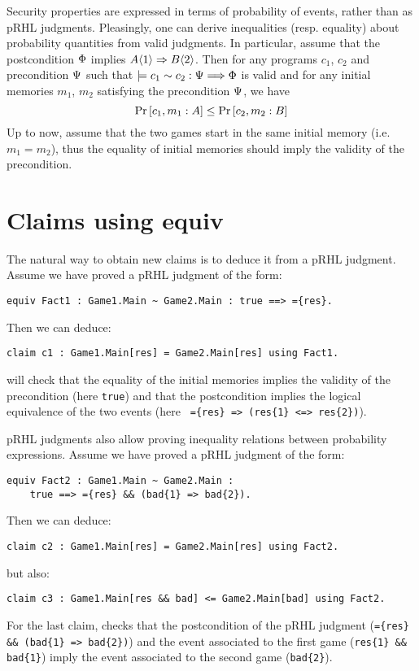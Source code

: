 Security properties are expressed in terms of probability of events,
rather than as pRHL judgments. Pleasingly, one can derive inequalities
(resp. equality) about probability quantities from valid judgments. In
particular, assume that the postcondition $\post$ implies $A\sidel
\Rightarrow B\sider$. Then for any programs $c_1$, $c_2$ and
precondition $\pre$ such that $\Equiv{c_1}{c_2}{\pre}{\post}$ is valid
and for any initial memories $m_1$, $m_2$ satisfying the precondition
$\pre$, we have
$$\Prm{c_1}{A}{m_1} \leq \Prm{c_2}{B}{m_2}$$
Up to now, \easycrypt assume that the two games start in the same initial
memory (i.e. $m_1 = m_2$), thus the equality of initial memories should
imply the validity of the precondition.

\section{Claims using equiv}

The natural way to obtain new claims is to deduce it from a pRHL judgment.
Assume we have proved a pRHL judgment of the form: 
\begin{verbatim}
equiv Fact1 : Game1.Main ~ Game2.Main : true ==> ={res}.
\end{verbatim} 
Then we can deduce:
\begin{verbatim}
claim c1 : Game1.Main[res] = Game2.Main[res] using Fact1.
\end{verbatim}
\easycrypt will check that the equality of the initial memories implies
the validity of the precondition (here \verb+true+) and that the
postcondition implies the logical equivalence of the two events 
(here \verb+ ={res} => (res{1} <=> res{2})+).

pRHL judgments also allow proving inequality relations between probability
expressions.  Assume we have proved a pRHL judgment of the form:
\begin{verbatim}
equiv Fact2 : Game1.Main ~ Game2.Main : 
    true ==> ={res} && (bad{1} => bad{2}).
\end{verbatim} 
Then we can deduce:
\begin{verbatim}
claim c2 : Game1.Main[res] = Game2.Main[res] using Fact2.
\end{verbatim}
but also:
\begin{verbatim}
claim c3 : Game1.Main[res && bad] <= Game2.Main[bad] using Fact2.
\end{verbatim}
For the last claim, \EasyCrypt checks that the postcondition of 
the pRHL judgment (\verb+={res} && (bad{1} => bad{2})+)
and the event associated to the first game (\verb+res{1} && bad{1}+)
imply the event associated to the second game (\verb+bad{2}+).

